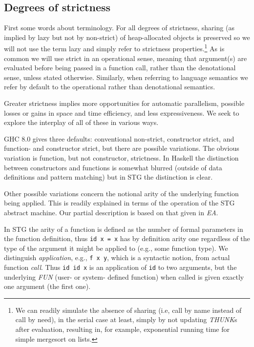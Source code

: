 \documentclass{llncs}
\begin{document}
\subsection{Degrees of strictness}
First some words about terminology.  For all degrees of strictness, sharing
(as implied by lazy but not by non-strict) of heap-allocated objects is
preserved so we will not use the term lazy and simply refer to
strictness properties.\footnote{%
  We can readily simulate the absence of sharing (i.e, call by name instead of
  call by need), in the serial case at least, simply by not updating \emph{THUNK}s
after evaluation, resulting in, for example, exponential running time for
simple mergesort on lists.}
  As is common we will use strict in an operational
sense, meaning that argument(s) are evaluated before being passed in a
function call, rather than the denotational sense, unless stated otherwise.
Similarly, when referring to language semantics we refer by default to the
operational rather than denotational semantics.

Greater strictness implies more opportunities for automatic parallelism,
possible losses or gains in space and time efficiency, and less expressiveness.  We
seek to explore the interplay of all of these in various ways.

GHC 8.0 gives three defaults: conventional non-strict, constructor strict, and
function- and constructor strict, but there are possible variations.  The
obvious variation is function, but not constructor, strictness.  In Haskell
the distinction between constructors and functions is somewhat blurred
(outside of data definitions and pattern matching) but in STG the distinction
is clear.

Other possible variations concern the notional arity of the underlying
function being applied.  This is readily explained in terms of the operation
of the STG abstract machine.  Our partial description is based on that given
in \emph{EA}.

In STG the arity of a function is defined as the number of formal parameters
in the function definition, thus \texttt{id x = x} has by definition arity one
regardless of the type of the argument it might be applied to (e.g., some
function type).  We distinguish \emph{application}, e.g., \texttt{f x y},
which is a syntactic notion, from actual function \emph{call}. Thus \texttt{id
  id x} is an application of \texttt{id} to two arguments, but the underlying
\emph{FUN} (user- or system- defined function) when called is given exactly
one argument (the first one).
\end{document}
